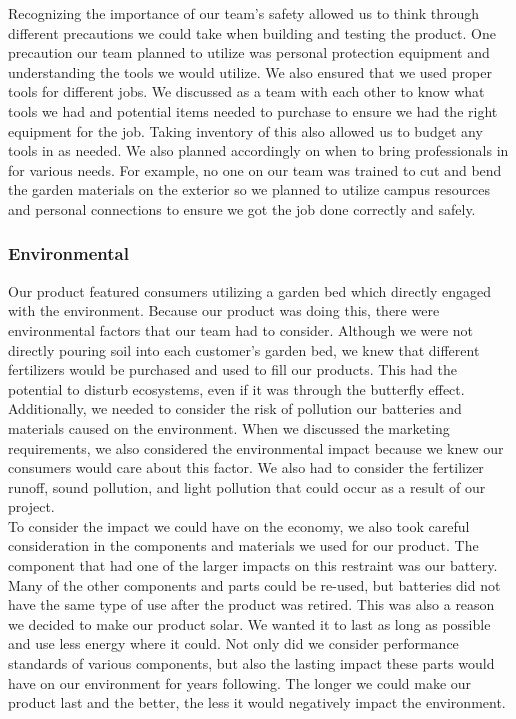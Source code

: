 Recognizing the importance of our team's safety allowed us to think through different precautions we could take when building and testing the product. One precaution our team planned to utilize was personal protection equipment and understanding the tools we would utilize. We also ensured that we used proper tools for different jobs. We discussed as a team with each other to know what tools we had and potential items needed to purchase to ensure we had the right equipment for the job. Taking inventory of this also allowed us to budget any tools in as needed. We also planned accordingly on when to bring professionals in for various needs. For example, no one on our team was trained to cut and bend the garden materials on the exterior so we planned to utilize campus resources and personal connections to ensure we got the job done correctly and safely.\\
\subsubsection{Environmental}
Our product featured consumers utilizing a garden bed which directly engaged with the environment. Because our product was doing this, there were environmental factors that our team had to consider. Although we were not directly pouring soil into each customer's garden bed, we knew that different fertilizers would be purchased and used to fill our products. This had the potential to disturb ecosystems, even if it was through the butterfly effect. Additionally, we needed to consider the risk of pollution our batteries and materials caused on the environment. When we discussed the marketing requirements, we also considered the environmental impact because we knew our consumers would care about this factor. We also had to consider the fertilizer runoff, sound pollution, and light pollution that could occur as a result of our project.\\

To consider the impact we could have on the economy, we also took careful consideration in the components and materials we used for our product. The component that had one of the larger impacts on this restraint was our battery. Many of the other components and parts could be re-used, but batteries did not have the same type of use after the product was retired. This was also a reason we decided to make our product solar. We wanted it to last as long as possible and use less energy where it could. Not only did we consider performance standards of various components, but also the lasting impact these parts would have on our environment for years following. The longer we could make our product last and the better, the less it would negatively impact the environment.\\
